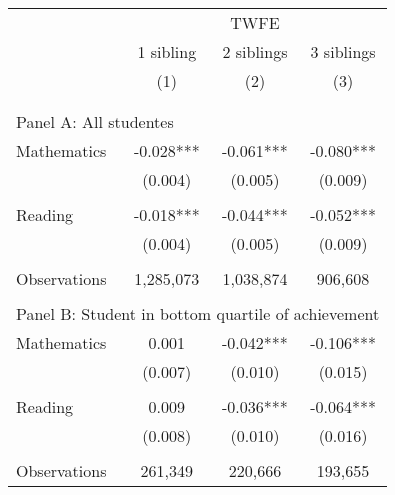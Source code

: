 \makeatletter
{}
{
\makeatother
\begin{tabular}{lccc}
\toprule
\cmidrule(lr){2-4}
& \multicolumn{3}{c}{TWFE} \\
\cmidrule(lr){2-4}
& 1 sibling & 2 siblings & 3 siblings  \\
\cmidrule(lr){2-2} \cmidrule(lr){3-3} \cmidrule(lr){4-4}
& (1) & (2) & (3)\\
\bottomrule
&  &  &  \\
&  &  &   \\
\multicolumn{4}{l}{Panel A: All studentes } \\
Mathematics         &      -0.028***&      -0.061***&      -0.080***\\
                    &     (0.004)   &     (0.005)   &     (0.009)   \\
 
&  &  &   \\
Reading             &      -0.018***&      -0.044***&      -0.052***\\
                    &     (0.004)   &     (0.005)   &     (0.009)   \\
                    &               &               &               \\
Observations        &   1,285,073   &   1,038,874   &     906,608   \\
 
&  &  &   \\
\multicolumn{4}{l}{Panel B: Student in bottom quartile of achievement} \\
Mathematics         &       0.001   &      -0.042***&      -0.106***\\
                    &     (0.007)   &     (0.010)   &     (0.015)   \\
 
&  &  &   \\
Reading             &       0.009   &      -0.036***&      -0.064***\\
                    &     (0.008)   &     (0.010)   &     (0.016)   \\
                    &               &               &               \\
Observations        &     261,349   &     220,666   &     193,655   \\
 

\end{tabular}}
